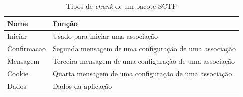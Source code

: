 \begin{table}[ht!]
  \begin{center}
  \setlength{\belowcaptionskip}{10pt} %
  \footnotesize {
      \begin{tabular}{|p{4cm}|p{9cm}|}
	  \hline
	  \textbf{Nome} & \textbf{Função} \\
	  \hline
	  Iniciar & Usado para iniciar uma associação \\
	  \hline
	  Confirmacao & Segunda mensagem de uma configuração de uma associação\\
	  \hline
	  Mensagem & Terceira mensagem de uma configuração de uma associação\\
	  \hline
	  Cookie & Quarta mensagem de uma configuração de uma associação\\
	  \hline
	  Dados & Dados da aplicação\\
	  \hline
      \end{tabular}
  }
  \caption{Tipos de \textit{chunk} de um pacote SCTP}
  \label{tabela1}
  \end{center}
\end{table}

